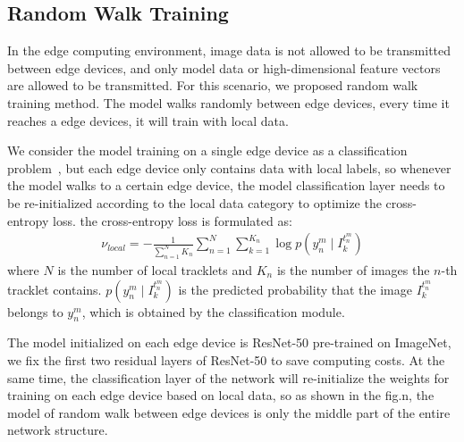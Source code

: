 \documentclass{article}
\begin{document}
\subsection{Random Walk Training}
In the edge computing environment, image data is not allowed to be transmitted between edge devices, and only model data or high-dimensional feature vectors are allowed to be transmitted. For this scenario, we proposed random walk training method. The model walks randomly between edge devices, every time it reaches a edge devices, it will train with local data.

We consider the model training on a single edge device as a classification problem~\cite{zheng2016person}, but each edge device only contains data with local labels, so whenever the model walks to a certain edge device, the model classification layer needs to be re-initialized according to the local data category to optimize the cross-entropy loss. the cross-entropy loss is formulated as:
\begin{equation}
\begin{aligned}
    \nu _{local}=-\frac{1}{\sum_{n=1}^{N} K_{n}}\sum_{n=1}^{N}\sum_{k=1}^{K_{n}}\log p(y_{n}^{m}\mid I_{k}^{t_{n}^{m}})
\end{aligned}
\end{equation}
where $N$ is the number of local tracklets and $K_{n}$ is the number of images the $n$-th tracklet contains. $p(y_{n}^{m}\mid I_{k}^{t_{n}^{m}})$ is the predicted probability that the image $I_{k}^{t_{n}^{m}}$ belongs to $y_{n}^{m}$, which is obtained by the classification module.


The model initialized on each edge device is ResNet-50 pre-trained on ImageNet, we fix the first two residual layers of ResNet-50 to save computing costs. At the same time, the classification layer of the network will re-initialize the weights for training on each edge device based on local data, so as shown in the fig.n, the model of random walk between edge devices is only the middle part of the entire network structure.
\end{document}
